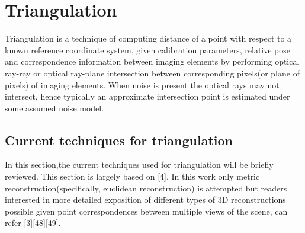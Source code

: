 \chapter{Triangulation}
Triangulation is a technique of computing distance of a point with respect to a known reference coordinate system, given calibration parameters, relative pose and correspondence information between imaging elements by performing optical ray-ray or optical ray-plane intersection between corresponding pixels(or plane of pixels) of imaging elements. When noise is present the optical rays may not intersect, hence typically an approximate intersection point is estimated under some assumed noise model.

\section{Current techniques for triangulation}
In this section,the current techniques used for triangulation will be briefly reviewed. This section is largely based on [4]. In this work only metric reconstruction(specifically, euclidean reconstruction) is attempted but readers interested in more detailed exposition of different types of 3D reconstructions possible given point correspondences between multiple views of the scene, can refer [3][48][49]. 

